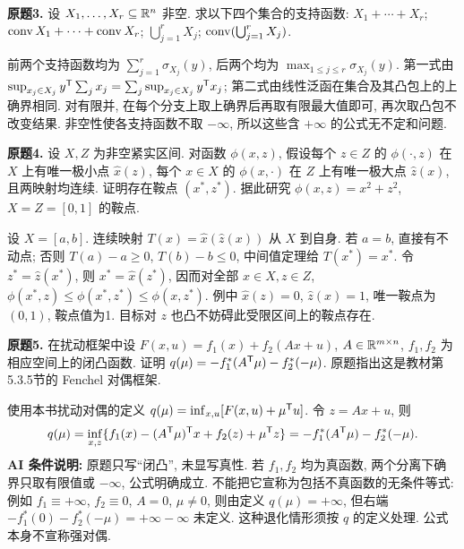 \begin{exercise}\label{ass:6253-hw4-q3}
\textbf{原题3.} 设 $X_1,\ldots,X_r\subseteq\mathbb R^n$ 非空. 求以下四个集合的支持函数:
$X_1+\cdots+X_r$;
$\operatorname{conv} X_1+\cdots+\operatorname{conv} X_r$;
$\bigcup_{j=1}^rX_j$;
$\operatorname{conv}(\bigcup_{j=1}^rX_j)$.
\end{exercise}
\begin{solution}
前两个支持函数均为 $\sum_{j=1}^r\sigma_{X_j}(y)$, 后两个均为 $\max_{1\le j\le r}\sigma_{X_j}(y)$. 第一式由
$\sup_{x_j\in X_j}y^{\mathsf T}\sum_jx_j=\sum_j\sup_{x_j\in X_j}y^{\mathsf T} x_j$; 第二式由线性泛函在集合及其凸包上的上确界相同. 对有限并, 在每个分支上取上确界后再取有限最大值即可, 再次取凸包不改变结果. 非空性使各支持函数不取 $-\infty$, 所以这些含 $+\infty$ 的公式无不定和问题.
\end{solution}

\begin{exercise}\label{ass:6253-hw4-q4}
\textbf{原题4.} 设 $X,Z$ 为非空紧实区间. 对函数 $\phi(x,z)$, 假设每个 $z\in Z$ 的 $\phi(\cdot,z)$ 在 $X$ 上有唯一极小点 $\hat x(z)$, 每个 $x\in X$ 的 $\phi(x,\cdot)$ 在 $Z$ 上有唯一极大点 $\hat z(x)$, 且两映射均连续. 证明存在鞍点 $(x^*,z^*)$. 据此研究 $\phi(x,z)=x^2+z^2$, $X=Z=[0,1]$ 的鞍点.
\end{exercise}
\begin{solution}
设 $X=[a,b]$. 连续映射 $T(x)=\hat x(\hat z(x))$ 从 $X$ 到自身. 若 $a=b$, 直接有不动点; 否则 $T(a)-a\ge0$, $T(b)-b\le0$, 中间值定理给 $T(x^*)=x^*$. 令 $z^*=\hat z(x^*)$, 则 $x^*=\hat x(z^*)$, 因而对全部 $x\in X,z\in Z$,
$\phi(x^*,z)\le\phi(x^*,z^*)\le\phi(x,z^*)$.
例中 $\hat x(z)=0$, $\hat z(x)=1$, 唯一鞍点为 $(0,1)$, 鞍点值为1. 目标对 $z$ 也凸不妨碍此受限区间上的鞍点存在.
\end{solution}

\begin{exercise}\label{ass:6253-hw4-q5}
\textbf{原题5.} 在扰动框架中设 $F(x,u)=f_1(x)+f_2(Ax+u)$, $A\in\mathbb R^{m\times n}$, $f_1,f_2$ 为相应空间上的闭凸函数. 证明 $q(\mu)=-f_1^*(A^{\mathsf T}\mu)-f_2^*(-\mu)$. 原题指出这是教材第5.3.5节的 Fenchel 对偶框架.
\end{exercise}
\begin{solution}
使用本书扰动对偶的定义 $q(\mu)=\inf_{x,u}[F(x,u)+\mu^{\mathsf T} u]$. 令 $z=Ax+u$, 则
\[
q(\mu)=\inf_{x,z}\{f_1(x)-(A^{\mathsf T}\mu)^{\mathsf T} x+f_2(z)+\mu^{\mathsf T} z\}
=-f_1^*(A^{\mathsf T}\mu)-f_2^*(-\mu).
\]
\textbf{AI 条件说明:} 原题只写“闭凸”, 未显写真性. 若 $f_1,f_2$ 均为真函数, 两个分离下确界只取有限值或 $-\infty$, 公式明确成立. 不能把它宣称为包括不真函数的无条件等式: 例如 $f_1\equiv+\infty$, $f_2\equiv0$, $A=0$, $\mu\ne0$, 则由定义 $q(\mu)=+\infty$, 但右端 $-f_1^*(0)-f_2^*(-\mu)=+\infty-\infty$ 未定义. 这种退化情形须按 $q$ 的定义处理. 公式本身不宣称强对偶.
\end{solution}


